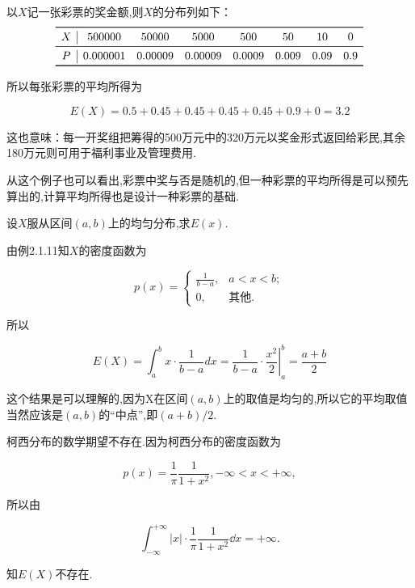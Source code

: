 	\begin{solution} 以$ X $记一张彩票的奖金额,则$ X $的分布列如下：
	\[
	\begin{array}{c|ccccccc}
	\toprule
	X     & 500000 & 50000 & 5000  & 500   & 50    & 10    & 0 \\\midrule
	P     & 0.000001 & 0.00009 & 0.00009 & 0.0009 & 0.009 & 0.09  & 0.9 \\\bottomrule
	\end{array}
	\]
	
	
	所以每张彩票的平均所得为
	
	\[
	E(X)=0.5+0.45+0.45+0.45+0.45+0.9+0=3.2
	\]
	
	这也意味：每一开奖组把筹得的500万元中的320万元以奖金形式返回给彩民,其余180万元则可用于福利事业及管理费用.
	
	从这个例子也可以看出,彩票中奖与否是随机的,但一种彩票的平均所得是可以预先算出的,计算平均所得也是设计一种彩票的基础.
	
\end{solution}

\begin{example}
	设$X$服从区间$ (a,b) $上的均匀分布,求$ E(x) $.
\end{example}
	
	\begin{solution}
    由例2.1.11知$ X $的密度函数为
	
	\[
	  p(x) = \begin{cases}
	    \frac{1}{b-a}, & a<x<b;  \\
        0, &  \text{其他}.
	  \end{cases}
	\]
	
	所以
	
	\[
	E(X)=\int_{a}^{b} x \cdot \frac{1}{b-a} d x=\frac{1}{b-a} \cdot\left.\frac{x^{2}}{2}\right|_{a} ^{b}=\frac{a+b}{2}
	\]
	
	这个结果是可以理解的,因为X在区间$ (a,b) $上的取值是均匀的,所以它的平均取值当然应该是$ (a,b) $的“中点”,即$ (a+b)/2 $.
	
	
\end{solution}

\begin{example}
	柯西分布的数学期望不存在.因为柯西分布的密度函数为
	
	\[
	p(x)=\frac{1}{\pi} \frac{1}{1+x^{2}},-\infty<x<+\infty,
	\]
	
	所以由
	
	\[
	\int_{-\infty}^{+\infty}|x| \cdot \frac{1}{\pi} \frac{1}{1+x^{2}} \dd  x=+\infty.
	\]
	
	知$ E(X) $不存在.
	
\end{example}

